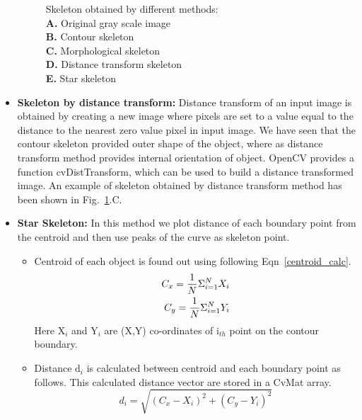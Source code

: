 \begin{itemize}
\begin{figure}[!b]
\caption{Skeleton obtained by different methods:\\
 \textbf{A.} Original gray scale image\\
 \textbf{B.} Contour skeleton\\
 \textbf{C.} Morphological skeleton\\
 \textbf{D.} Distance transform skeleton\\
 \textbf{E.} Star skeleton}
\label{skeletons}
\end{figure}
\item \textbf{Skeleton by distance transform:} Distance transform of an
 input image is obtained by creating a new image where pixels are
 set to a value equal to the distance to the nearest zero value
 pixel in input image. We have seen that the contour skeleton
 provided outer shape of the object, where as distance transform
 method provides internal orientation of object. OpenCV provides
 a function cvDistTransform, which can be used to build a
 distance transformed image. An example of skeleton obtained by
 distance transform method has been shown in
 Fig.~\ref{skeletons}.C.
\item \textbf{Star Skeleton:} In this method we plot distance of each
 boundary point from the centroid and then use peaks of the curve
 as skeleton point.
\begin{itemize}
\item Centroid of each object is found out using following
 Eqn~\ref{centroid_calc}.
 \begin{eqnarray}
 C_x = {1 \over N} \Sigma ^N _{i = 1} X_i \label{centroid_calc}
\nonumber \\
 C_y = {1 \over N} \Sigma ^N _{i = 1} Y_i 
 \end{eqnarray}
Here X$_i$ and Y$_i$ are (X,Y) co-ordinates of i$_{th}$ point on the contour
boundary.
\item Distance d$_i$ is calculated between centroid and each boundary
 point as follows. This calculated distance vector are stored in a
 CvMat array.
 \begin{equation}
 d_i = \sqrt{(C_x - X_i)^2 + (C_y - Y_i)^2} \label{dist_calc}
 \end{equation}


\end{itemize}
\end{itemize}
